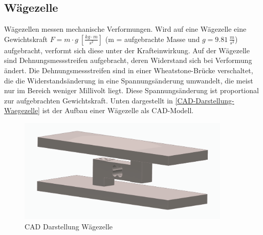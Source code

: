 \subsection{Wägezelle}

Wägezellen messen mechanische Verformungen.
Wird auf eine Wägezelle eine Gewichtskraft \mbox{$F = m \cdot g \: [\frac{kg \cdot m}{s^2}]$} (m = aufgebrachte Masse und $g = 9.81 \: \frac{m}{s^2}$)  aufgebracht, verformt sich diese unter der Krafteinwirkung.
Auf der Wägezelle sind Dehnungsmessstreifen aufgebracht, deren Widerstand sich bei Verformung ändert.
Die Dehnungsmessstreifen sind in einer Wheatstone-Brücke verschaltet, die die Widerstandsänderung in eine Spannungsänderung umwandelt, die meist nur im Bereich weniger Millivolt liegt.
Diese Spannungsänderung ist proportional zur aufgebrachten Gewichtskraft.
Unten dargestellt in \autoref{CAD-Darstellung-Waegezelle} ist der Aufbau einer Wägezelle als CAD-Modell. \\
\begin{figure}[h!]
    \centering
    \includegraphics[width=0.9\textwidth]{img/CAD_Waegezelle.png}
    \caption{CAD Darstellung Wägezelle}
    \label{fig:CAD-Darstellung-Waegezelle}
\end{figure}

